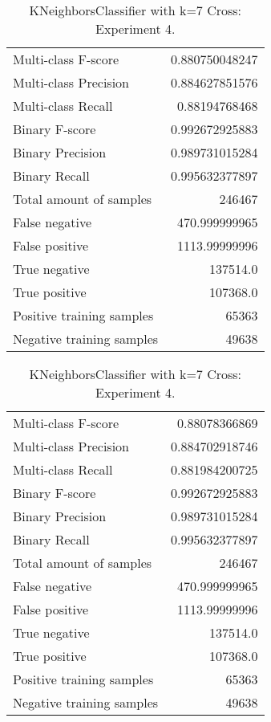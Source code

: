 \begin{table}[H]
\begin{minipage}{0.5\textwidth}
\caption{KNeighborsClassifier with k=7 Cross: Experiment 3.}
\centering
\begin{tabular}{l r}
\toprule
Multi-class F-score & 0.880750048247 \\
Multi-class Precision & 0.884627851576 \\
Multi-class Recall & 0.88194768468 \\
\midrule
Binary F-score & 0.992672925883 \\
Binary Precision & 0.989731015284 \\
Binary Recall & 0.995632377897 \\
\midrule
Total amount of samples & 246467 \\
False negative & 470.999999965 \\
False positive & 1113.99999996 \\
True negative & 137514.0 \\
True positive & 107368.0 \\
\midrule
Positive training samples & 65363 \\
Negative training samples & 49638 \\
\bottomrule
\end{tabular}
\end{minipage}
\hfillx
\begin{minipage}{0.5\textwidth}
\caption{KNeighborsClassifier with k=7 Cross: Experiment 4.}
\centering
\begin{tabular}{l r}
\toprule
Multi-class F-score & 0.88078366869 \\
Multi-class Precision & 0.884702918746 \\
Multi-class Recall & 0.881984200725 \\
\midrule
Binary F-score & 0.992672925883 \\
Binary Precision & 0.989731015284 \\
Binary Recall & 0.995632377897 \\
\midrule
Total amount of samples & 246467 \\
False negative & 470.999999965 \\
False positive & 1113.99999996 \\
True negative & 137514.0 \\
True positive & 107368.0 \\
\midrule
Positive training samples & 65363 \\
Negative training samples & 49638 \\
\bottomrule
\end{tabular}
\end{minipage}
\end{table}
